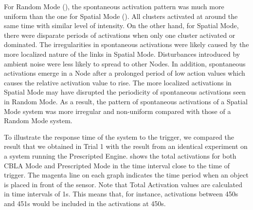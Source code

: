 \FloatBarrier
For Random Mode (), the spontaneous activation pattern was much more uniform than the one for Spatial Mode (). All clusters activated at around the same time with similar level of intensity. On the other hand, for Spatial Mode, there were disparate periods of activations when only one cluster activated or dominated. The irregularities in spontaneous activations were likely caused by the more localized nature of the links in Spatial Mode. Disturbances introduced by ambient noise were less likely to spread to other Nodes. In addition, spontaneous activations emerge in a Node after a prolonged period of low action values which causes the relative activation value to rise. The more localized activations in Spatial Mode may have disrupted the periodicity of spontaneous activations seen in Random Mode. As a result, the pattern of spontaneous activations of a Spatial Mode system was more irregular and non-uniform compared with those of a Random Mode system.

To illustrate the response time of the system to the trigger, we compared the result that we obtained in Trial 1 with the result from an identical experiment on a system running the Prescripted Engine.  shows the total activations for both CBLA Mode and Prescripted Mode in the time interval close to the time of trigger. The magenta line on each graph indicates the time period when an object is placed in front of the sensor. Note that Total Activation values are calculated in time intervals of 1s. This means that, for instance, activations between 450s and 451s would be included in the activations at 450s. 

